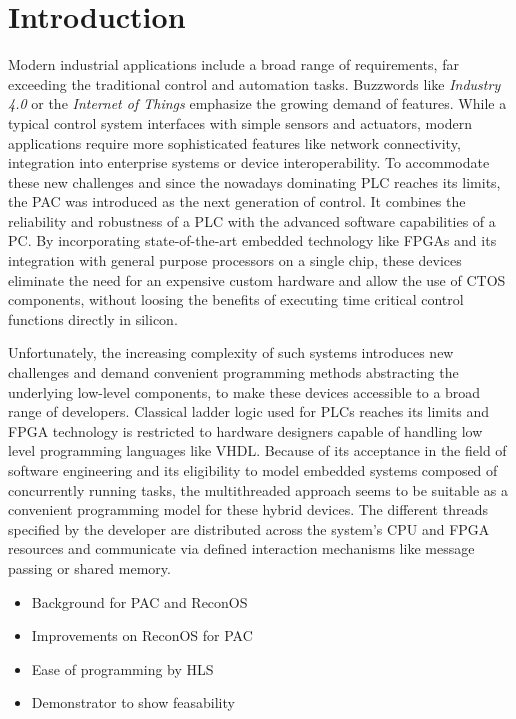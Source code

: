 \chapter{Introduction}

Modern industrial applications include a broad range of requirements, far
exceeding the traditional control and automation tasks. Buzzwords like
\emph{Industry 4.0} or the \emph{Internet of Things} emphasize the growing
demand of features. While a typical control system interfaces with simple
sensors and actuators, modern applications require more sophisticated features
like network connectivity, integration into enterprise systems or device
interoperability. To accommodate these new challenges and since the nowadays
dominating \ac{PLC} reaches its limits, the \ac{PAC} was introduced as the
next generation of control. It combines the reliability and robustness of a
\ac{PLC} with the advanced software capabilities of a \ac{PC}. By
incorporating state-of-the-art embedded technology like \acp{FPGA} and its
integration with general purpose processors on a single chip, these devices
eliminate the need for an expensive custom hardware and allow  the use of
\ac{CTOS} components, without loosing the benefits of executing time critical
control functions directly in silicon.

Unfortunately, the increasing complexity of such systems introduces new
challenges and demand convenient programming methods abstracting the
underlying low-level components, to make these devices accessible to a broad
range of developers. Classical ladder logic used for \acp{PLC} reaches its
limits and \ac{FPGA} technology is restricted to hardware designers capable of
handling low level programming languages like VHDL. Because of its acceptance
in the field of software engineering and its eligibility to model embedded
systems composed of concurrently running tasks, the multithreaded approach
seems to be suitable as a convenient programming model for these hybrid
devices. The different threads specified by the developer are distributed
across the system's \ac{CPU} and \ac{FPGA} resources and communicate via
defined interaction mechanisms like message passing or shared memory.

\begin{itemize}
\item Background for PAC and ReconOS
\item Improvements on ReconOS for PAC
\item Ease of programming by HLS
\item Demonstrator to show feasability
\end{itemize}
